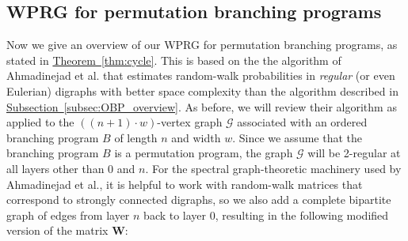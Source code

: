 \documentclass[11pt]{article}
\numberwithin{equation}{section}
\theoremstyle{definition}
\theoremstyle{plain}
\newcommand{\expref}[2]{\hyperref[#2]{#1~\ref{#2}}}
\newcommand{\cG}{\mathcal{G}}
\newcommand{\mW}{\mathbf{W}}
\begin{document}
    \subsection{WPRG for permutation branching programs}\label{subsec:PBP_proof_overview}
    Now we give an overview of our WPRG for permutation branching programs, as stated in \expref{Theorem}{thm:cycle}. This is based on the
    the algorithm of 
%
Ahmadinejad  %
et al. that estimates random-walk probabilities in \emph{regular} (or even Eulerian) digraphs with better space complexity than the algorithm described in \expref{Subsection}{subsec:OBP_overview}.  As before, we will review their algorithm as applied to the $((n+1)\cdot w)$-vertex graph $\cG$ associated with an ordered branching program $B$ of length $n$ and width $w$.  Since we assume that the branching program $B$ is a permutation program, the graph $\cG$ will be 2-regular at all layers other than $0$ and $n$.  For the spectral graph-theoretic machinery used by 
%
Ahmadinejad  %
et al., it is helpful to work with random-walk matrices that correspond to strongly connected digraphs, so we also add a complete bipartite graph of edges from layer $n$ back to layer $0$, resulting in the following modified version of the matrix $\mW$:
    
\end{document}
